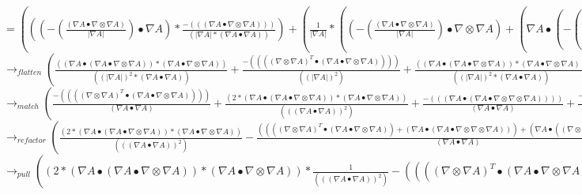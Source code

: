 \documentclass{article}
\begin{document}
$= (((-( \frac{( \nabla A \bullet  \nabla  \otimes  \nabla A)}{| \nabla A|}) \bullet  \nabla A)* \frac{-((( \nabla A \bullet  \nabla  \otimes  \nabla A)))}{(| \nabla A|*( \nabla A \bullet  \nabla A))})+( \frac{1}{| \nabla A|}*((-( \frac{( \nabla A \bullet  \nabla  \otimes  \nabla A)}{| \nabla A|}) \bullet  \nabla  \otimes  \nabla A)+( \nabla A \bullet (-( \frac{((| \nabla A|*((( \nabla A \bullet  \nabla  \otimes  \nabla  \otimes  \nabla A))^T+((( \nabla  \otimes  \nabla A)^T \bullet  \nabla  \otimes  \nabla A))^T))-(( \frac{( \nabla A \bullet  \nabla  \otimes  \nabla A)}{| \nabla A|}*( \nabla A \bullet  \nabla  \otimes  \nabla A))))}{( \nabla A \bullet  \nabla A)}))^T))))$
\newline $\rightarrow_{flatten}( \frac{(( \nabla A \bullet ( \nabla A \bullet  \nabla  \otimes  \nabla A))*( \nabla A \bullet  \nabla  \otimes  \nabla A))}{((| \nabla A|)^2*( \nabla A \bullet  \nabla A))}+ \frac{-(((( \nabla  \otimes  \nabla A)^T \bullet ( \nabla A \bullet  \nabla  \otimes  \nabla A))))}{((| \nabla A|)^2)}+ \frac{(( \nabla A \bullet ( \nabla A \bullet  \nabla  \otimes  \nabla A))*( \nabla A \bullet  \nabla  \otimes  \nabla A))}{((| \nabla A|)^2*( \nabla A \bullet  \nabla A))}+ \frac{-((| \nabla A|*( \nabla A \bullet ( \nabla A \bullet  \nabla  \otimes  \nabla  \otimes  \nabla A))))}{(| \nabla A|*( \nabla A \bullet  \nabla A))}+ \frac{-((| \nabla A|*( \nabla A \bullet (( \nabla  \otimes  \nabla A)^T \bullet  \nabla  \otimes  \nabla A))))}{(| \nabla A|*( \nabla A \bullet  \nabla A))})$
\newline $\rightarrow_{match}( \frac{-(((( \nabla  \otimes  \nabla A)^T \bullet ( \nabla A \bullet  \nabla  \otimes  \nabla A))))}{( \nabla A \bullet  \nabla A)}+ \frac{(2*( \nabla A \bullet ( \nabla A \bullet  \nabla  \otimes  \nabla A))*( \nabla A \bullet  \nabla  \otimes  \nabla A))}{((( \nabla A \bullet  \nabla A))^2)}+ \frac{-((( \nabla A \bullet ( \nabla A \bullet  \nabla  \otimes  \nabla  \otimes  \nabla A))))}{( \nabla A \bullet  \nabla A)}+ \frac{-((( \nabla A \bullet (( \nabla  \otimes  \nabla A)^T \bullet  \nabla  \otimes  \nabla A))))}{( \nabla A \bullet  \nabla A)})$
\newline $\rightarrow_{refactor}( \frac{(2*( \nabla A \bullet ( \nabla A \bullet  \nabla  \otimes  \nabla A))*( \nabla A \bullet  \nabla  \otimes  \nabla A))}{((( \nabla A \bullet  \nabla A))^2)}- \frac{(((( \nabla  \otimes  \nabla A)^T \bullet ( \nabla A \bullet  \nabla  \otimes  \nabla A))+( \nabla A \bullet ( \nabla A \bullet  \nabla  \otimes  \nabla  \otimes  \nabla A)))+( \nabla A \bullet (( \nabla  \otimes  \nabla A)^T \bullet  \nabla  \otimes  \nabla A)))}{( \nabla A \bullet  \nabla A)})$
\newline $\rightarrow_{pull}((2*( \nabla A \bullet ( \nabla A \bullet  \nabla  \otimes  \nabla A))*( \nabla A \bullet  \nabla  \otimes  \nabla A))* \frac{1}{((( \nabla A \bullet  \nabla A))^2)}-(((( \nabla  \otimes  \nabla A)^T \bullet ( \nabla A \bullet  \nabla  \otimes  \nabla A))+( \nabla A \bullet ( \nabla A \bullet  \nabla  \otimes  \nabla  \otimes  \nabla A)))+( \nabla A \bullet (( \nabla  \otimes  \nabla A)^T \bullet  \nabla  \otimes  \nabla A)))* \frac{1}{( \nabla A \bullet  \nabla A)})$
\end{document}
